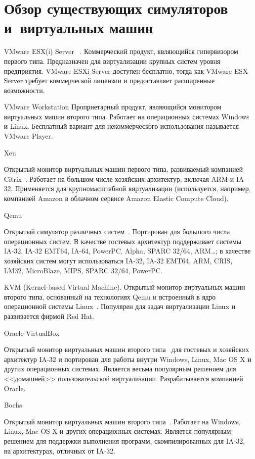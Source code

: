 \section{Обзор существующих симуляторов и~виртуальных машин}\label{sec:implementations}

\begin{description*}

\item [VMware ESX(i) Server]~\cite{vmware-esx}. Коммерческий продукт, являющийся гипервизором первого типа.  Предназначен для виртуализации крупных систем уровня предприятия. VMware ESXi Server доступен бесплатно, тогда как VMware ESX Server требует коммерческой лицензии и предоставляет расширенные возможности.

\item [VMware Workstation] Проприетарный продукт, являющийся монитором виртуальных машин второго типа. Работает на операционных системах Windows и Linux. Бесплатный вариант для некоммерческого использования называется VMware Player.

\item[Xen]

Открытый монитор виртуальных машин первого типа, развиваемый компанией Citrix~\cite{xen2006}. Работает на большом числе хозяйских архитектур, включая ARM и IA-32. Применяется для крупномасштабной виртуализации (используется, например, компанией Amazon в облачном сервисе Amazon Elastic Compute Cloud). 

\item[Qemu]

Открытый симулятор различных систем~\cite{qemu}. Портирован для большого числа операционных систем.
В качестве гостевых архитектур поддерживает системы IA-32, IA-32 EMT64, IA-64, PowerPC, Alpha, SPARC 32/64, ARM\dots; в качестве хозяйских систем могут использоваться IA-32, IA-32 EMT64, ARM, CRIS, LM32, MicroBlaze, MIPS, SPARC 32/64, PowerPC. 

\item[KVM] (\abbr Kernel-based Virtual Machine). Открытый монитор виртуальных машин второго типа, основанный на технологиях Qemu и встроенный в ядро операционной системы Linux~\cite{kvm-wiki}. Популярен для задач виртуализации Linux и развивается фирмой Red Hat.

\item[Oracle VirtualBox]

Открытый монитор виртуальных машин второго типа~\cite{virtualbox} для гостевых и хозяйских архитектур IA-32 и портирован для работы внутри Windows, Linux, Mac OS X и других операционных системах. Является весьма популярным решением для <<домашней>> пользовательской виртуализации. Разрабатывается компанией Oracle.

\item[Bochs]

Открытый монитор виртуальных машин второго типа~\cite{bochs}. Работает на Windows, Linux, Mac OS X и других операционных системах. Является популярным решением для поддержки выполнения программ, скомпилированных для IA-32, на архитектурах, отличных от IA-32.

\end{description*}

